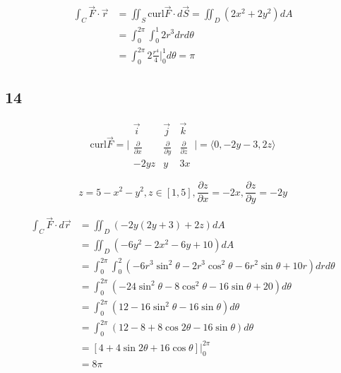 \documentclass{article}
\begin{document}
  $$\begin{aligned}
    \int_C \overrightarrow{F} \cdot \overrightarrow{r} &= \iint_S \textrm{curl} \overrightarrow{F} \cdot d\overrightarrow{S} = \iint_D (2x^2 + 2y^2) dA \\
                                                       &= \int_0^{2\pi} \int_0^{1} 2r^3 dr d\theta \\
                                                       &= \int_0^{2\pi} 2 \frac{r^4}{4}\biggl|_0^1 d\theta = \pi
  \end{aligned}
  $$

  \subsection*{14}

  $$\textrm{curl} \overrightarrow{F} = \biggl| \begin{matrix}
    \overrightarrow{i} & \overrightarrow{j} & \overrightarrow{k} \\
    \frac{\partial }{\partial x} & \frac{\partial }{\partial y} & \frac{\partial }{\partial z} \\
    -2yz & y & 3x 
  \end{matrix} \biggl| = \langle 0, -2y - 3, 2z \rangle
  $$

  $$z = 5 - x^2 - y^2, z \in [1, 5], \frac{\partial z}{\partial x} = -2x, \frac{\partial z}{\partial y} = -2y$$

  $$\begin{aligned}
    \int_C \overrightarrow{F} \cdot d\overrightarrow{r} &= \iint_D (-2y(2y + 3) + 2z) dA \\
                                                        &= \iint_D (-6y^2 - 2x^2 - 6y + 10) dA \\
                                                        &= \int_0^{2\pi} \int_0^2 (-6r^3 \sin^2 \theta - 2r^3 \cos^2 \theta - 6r^2 \sin \theta + 10r) dr d\theta \\
                                                        &= \int_0^{2\pi} (-24 \sin^2 \theta - 8 \cos^2 \theta - 16 \sin \theta + 20) d\theta \\
                                                        &= \int_0^{2\pi} (12 - 16 \sin^2 \theta - 16 \sin \theta) d \theta \\
                                                        &= \int_0^{2\pi} (12 - 8 + 8 \cos 2\theta - 16 \sin \theta) d\theta \\
                                                        &= [4 + 4 \sin 2\theta + 16 \cos \theta]\biggl|_0^{2\pi} \\
                                                        &= 8\pi
  \end{aligned}
  $$
\end{document}
